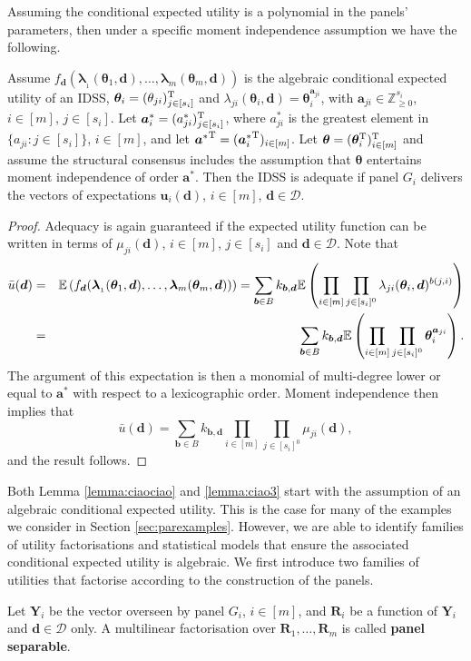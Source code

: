 Assuming the conditional expected utility is a polynomial in the panels' parameters, then under a specific moment independence assumption we have the following. 

\begin{lemma}
\label{lemma:ciao3}
Assume $f_{\bm{d}}(\bm{\lambda }_{_{1}}(\bm{\theta }_{1},\bm{d}),\dots,\bm{\lambda }_{m}(\bm{\theta }_{m},\bm{d}))$ is the algebraic conditional expected utility of an IDSS, $\bm{\theta}_i=(\theta_{ji})^{\textnormal{T}}_{j\in[s_i]}$ and $\lambda_{ji}(\bm{\theta}_i,\bm{d})=\bm{\theta}_{i}^{\bm{a}_{ji}}$, with $\bm{a}_{ji}\in\mathbb{Z}_{\geq 0}^{s_i}$, $i\in[m]$, $j\in[s_i]$. Let $\bm{a}^*_i=({a_{ji}^*})_{j\in[s_i]}^{\textnormal{T}}$, where $a_{ji}^*$ is the greatest element in $\{a_{ji}:j\in[s_i]\}$, $i\in[m]$, and let ${\bm{a}^*}^{\textnormal{T}}=({\bm{a}_i^*}^{\textnormal{T}})_{i\in[m]}$. Let $\bm{\theta}=(\bm{\theta}_i^{\textnormal{T}})_{i\in[m]}^{\textnormal{T}}$ and assume the structural consensus includes the assumption that $\bm{\theta}$ entertains moment independence of order $\bm{a}^*$. Then the IDSS is adequate if panel $G_i$ delivers  the vectors of expectations $\bm{u}_i(\bm{d})$, $i\in[m]$, $\bm{d}\in\bm{\mathcal{D}}$.
\end{lemma} 
\begin{proof}
Adequacy is again guaranteed if the expected utility function can be written in terms of $\mu_{ji}(\bm{d})$, $i\in[m]$, $j\in[s_i]$ and $\bm{d}\in\bm{\mathcal{D}}$. Note that
\begin{eqnarray*}
\bar{u}(\bm{d})&=&\mathbb{E}\left(f_{\bm{d}}(\bm{\lambda }_{_{1}}(\bm{\theta }_{1},\bm{d}),\dots,\bm{\lambda }_{m}(\bm{\theta }_{m},\bm{d}))\right)=\sum_{\bm{b}\in B}k_{\bm{b},\bm{d}}\mathbb{E}\left( \prod_{i\in[m]}\prod_{j\in[s_i]^0}\lambda_{ji}(\bm{\theta }_{i},\bm{d})^{b(j,i)}\right)\\
&=&\sum_{\bm{b}\in B}k_{\bm{b},\bm{d}}\mathbb{E}\left(\prod_{i\in[m]}\prod_{j\in[s_i]^0}\bm{\theta}_i^{\bm{a}_{ji}}\right).
\end{eqnarray*}
The argument of this expectation is then a monomial of multi-degree lower or equal to $\bm{a}^*$ with respect to a lexicographic order. Moment independence then implies that 
\begin{equation*}
\bar{u}(\bm{d})=\sum_{\bm{b}\in B}k_{\bm{b},\bm{d}}\prod_{i\in[m]}\prod_{j\in[s_i]^0}\mu_{ji}(\bm{d}),
\end{equation*}
and the result follows.
\end{proof}

Both Lemma \ref{lemma:ciaociao} and \ref{lemma:ciao3} start with the assumption of an algebraic conditional expected utility. This is the case for many of the examples we consider in Section \ref{sec:parexamples}. However, we are able to identify families of utility factorisations and statistical models that ensure the associated conditional expected utility is algebraic.  We first introduce two families of utilities that factorise according to the construction of the panels.
\begin{definition}
\label{def:panelsep}
Let $\bm{Y}_i$ be the vector overseen by panel $G_i$, $i\in[m]$, and $\bm{R}_i$ be a function of $\bm{Y}_i$ and $\bm{d}\in\bm{\mathcal{D}}$ only. A multilinear factorisation over $\bm{R}_1,\dots,\bm{R}_m$ is called \textbf{panel separable}.   
\end{definition}

